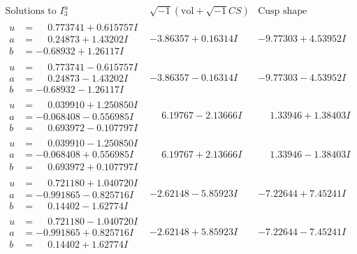 \documentclass[1p]{elsarticle_modified}
\theoremstyle{definition}
\newcommand{\I}{\sqrt{-1}}
\begin{document}
$$\begin{array}{c|c|c}  
\text{Solutions to }I^u_{3}& \I (\text{vol} + \sqrt{-1}CS) & \text{Cusp shape}\\
 \hline 
\begin{aligned}
u &= \phantom{-}0.773741 + 0.615757 I \\
a &= \phantom{-}0.24873 + 1.43202 I \\
b &= -0.68932 + 1.26117 I\end{aligned}
 & -3.86357 + 0.16314 I & -9.77303 + 4.53952 I \\ \hline\begin{aligned}
u &= \phantom{-}0.773741 - 0.615757 I \\
a &= \phantom{-}0.24873 - 1.43202 I \\
b &= -0.68932 - 1.26117 I\end{aligned}
 & -3.86357 - 0.16314 I & -9.77303 - 4.53952 I \\ \hline\begin{aligned}
u &= \phantom{-}0.039910 + 1.250850 I \\
a &= -0.068408 - 0.556985 I \\
b &= \phantom{-}0.693972 - 0.107797 I\end{aligned}
 & \phantom{-}6.19767 - 2.13666 I & \phantom{-}1.33946 + 1.38403 I \\ \hline\begin{aligned}
u &= \phantom{-}0.039910 - 1.250850 I \\
a &= -0.068408 + 0.556985 I \\
b &= \phantom{-}0.693972 + 0.107797 I\end{aligned}
 & \phantom{-}6.19767 + 2.13666 I & \phantom{-}1.33946 - 1.38403 I \\ \hline\begin{aligned}
u &= \phantom{-}0.721180 + 1.040720 I \\
a &= -0.991865 - 0.825716 I \\
b &= \phantom{-}0.14402 - 1.62774 I\end{aligned}
 & -2.62148 - 5.85923 I & -7.22644 + 7.45241 I \\ \hline\begin{aligned}
u &= \phantom{-}0.721180 - 1.040720 I \\
a &= -0.991865 + 0.825716 I \\
b &= \phantom{-}0.14402 + 1.62774 I\end{aligned}
 & -2.62148 + 5.85923 I & -7.22644 - 7.45241 I \\ \hline\begin{aligned}

\end{aligned}
\end{array}$$
\end{document}
